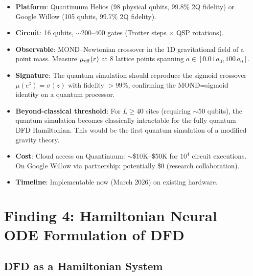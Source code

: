 \documentclass[11pt]{article}
\theoremstyle{definition}
\theoremstyle{remark}
\begin{document}
\begin{tcolorbox}[colback=green!5!white, colframe=green!60!black,
  title=\textbf{Near-Term DFD Quantum Simulation Experiment}]
\begin{itemize}[nosep]
\item \textbf{Platform}: Quantinuum Helios (98 physical qubits, 99.8\%
  2Q fidelity) or Google Willow (105 qubits, 99.7\% 2Q fidelity).
\item \textbf{Circuit}: 16 qubits, $\sim 200$--$400$ gates (Trotter
  steps $\times$ QSP rotations).
\item \textbf{Observable}: MOND--Newtonian crossover in the 1D
  gravitational field of a point mass. Measure $\mu_{\rm eff}(r)$ at
  8 lattice points spanning $a \in [0.01\,a_0, 100\,a_0]$.
\item \textbf{Signature}: The quantum simulation should reproduce the
  sigmoid crossover $\mu(e^z) = \sigma(z)$ with fidelity $> 99\%$,
  confirming the MOND=sigmoid identity on a quantum processor.
\item \textbf{Beyond-classical threshold}: For $L \geq 40$ sites (requiring
  $\sim 50$ qubits), the quantum simulation becomes classically
  intractable for the fully quantum DFD Hamiltonian. This would be the
  first quantum simulation of a modified gravity theory.
\item \textbf{Cost}: Cloud access on Quantinuum: $\sim$\$10K--\$50K for
  $10^4$ circuit executions. On Google Willow via partnership: potentially
  \$0 (research collaboration).
\item \textbf{Timeline}: Implementable now (March 2026) on existing hardware.
\end{itemize}
\end{tcolorbox}

\section{Finding 4: Hamiltonian Neural ODE Formulation of DFD}
\label{sec:hamiltonian-node}

\subsection{DFD as a Hamiltonian System}
\label{sec:dfd-hamiltonian}
\end{document}
